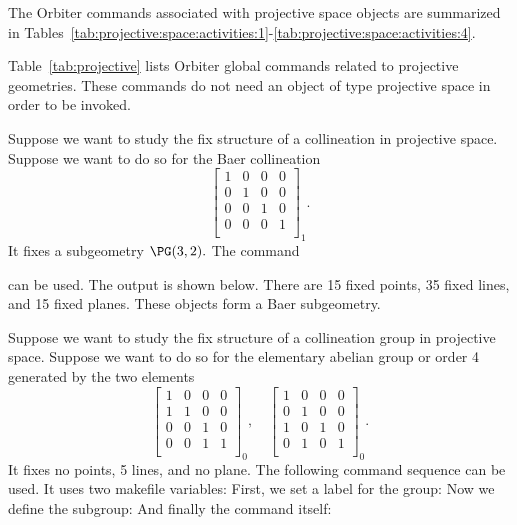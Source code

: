 

The Orbiter commands associated with projective space objects are summarized in 
Tables~\ref{tab:projective:space:activities:1}-\ref{tab:projective:space:activities:4}.


\bigskip



Table~\ref{tab:projective} lists Orbiter global commands 
related to projective geometries. 
These commands do not need an object 
of type projective space in order to be invoked.


\bigskip


Suppose we want to study the fix structure of a collineation in projective space. 
Suppose we want to do so for the Baer collineation 
$$
\left[
\begin{array}{cccc}
1&0&0&0\\
0&1&0&0\\
0&0&1&0\\
0&0&0&1\\
\end{array}
\right]_1.
$$
It fixes a subgeometry $\PG(3,2).$
The command 


can be used.
The output is shown below. 
There are 15 fixed points, 35 fixed lines, and 15 fixed planes. 
These objects form a Baer subgeometry.



\bigskip


Suppose we want to study the fix structure 
of a collineation group in projective space. 
Suppose we want to do so for the elementary 
abelian group or order 4 generated by the two elements 
$$
\left[
\begin{array}{cccc}
1&0&0&0\\
1&1&0&0\\
0&0&1&0\\
0&0&1&1\\
\end{array}
\right]_0,
\quad
\left[
\begin{array}{cccc}
1&0&0&0\\
0&1&0&0\\
1&0&1&0\\
0&1&0&1\\
\end{array}
\right]_0.
$$
It fixes no points, 5 lines, and no plane. 
The following command sequence can be used. It uses two makefile variables:
First, we set a label for the group:
Now we define the subgroup:
And finally the command itself:



